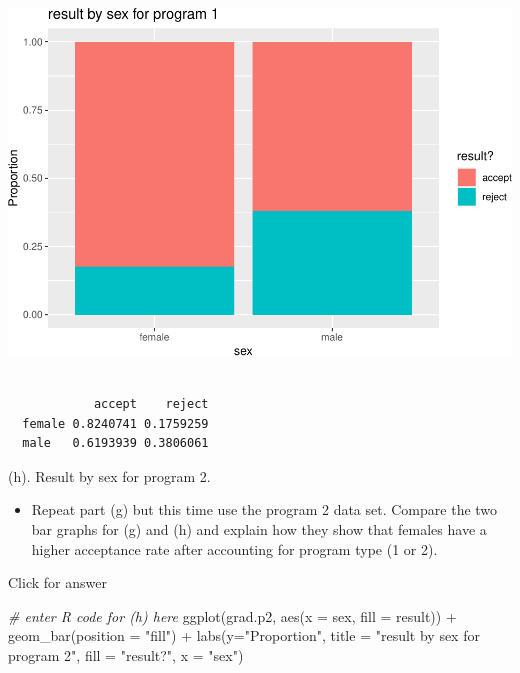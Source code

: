 \documentclass[
]{book}
\newenvironment{Shaded}{\begin{snugshade}}{\end{snugshade}}
\newcommand{\AttributeTok}[1]{\textcolor[rgb]{0.77,0.63,0.00}{#1}}
\newcommand{\CommentTok}[1]{\textcolor[rgb]{0.56,0.35,0.01}{\textit{#1}}}
\newcommand{\DecValTok}[1]{\textcolor[rgb]{0.00,0.00,0.81}{#1}}
\newcommand{\FunctionTok}[1]{\textcolor[rgb]{0.00,0.00,0.00}{#1}}
\newcommand{\NormalTok}[1]{#1}
\newcommand{\SpecialCharTok}[1]{\textcolor[rgb]{0.00,0.00,0.00}{#1}}
\newcommand{\StringTok}[1]{\textcolor[rgb]{0.31,0.60,0.02}{#1}}
\providecommand{\tightlist}{%
  \setlength{\itemsep}{0pt}\setlength{\parskip}{0pt}}
\begin{document}
\includegraphics[width=1\linewidth]{Class_Activity_4_files/figure-latex/unnamed-chunk-29-1}

\begin{Shaded}
\end{Shaded}

\begin{verbatim}
        
            accept    reject
  female 0.8240741 0.1759259
  male   0.6193939 0.3806061
\end{verbatim}

(h). Result by sex for program 2.

\begin{itemize}
\tightlist
\item
  Repeat part (g) but this time use the program 2 data set. Compare the two bar graphs for (g) and (h) and explain how they show that females have a higher acceptance rate after accounting for program type (1 or 2).
\end{itemize}

Click for answer

\begin{Shaded}
\begin{Highlighting}[]
\CommentTok{\# enter R code for (h) here}
\FunctionTok{ggplot}\NormalTok{(grad.p2, }\FunctionTok{aes}\NormalTok{(}\AttributeTok{x =}\NormalTok{ sex, }\AttributeTok{fill =}\NormalTok{ result)) }\SpecialCharTok{+}
 \FunctionTok{geom\_bar}\NormalTok{(}\AttributeTok{position =} \StringTok{"fill"}\NormalTok{) }\SpecialCharTok{+}
 \FunctionTok{labs}\NormalTok{(}\AttributeTok{y=}\StringTok{"Proportion"}\NormalTok{, }\AttributeTok{title =} \StringTok{"result by sex for program 2"}\NormalTok{,}
 \AttributeTok{fill =} \StringTok{"result?"}\NormalTok{, }\AttributeTok{x =} \StringTok{"sex"}\NormalTok{)}
\end{Highlighting}
\end{Shaded}
\end{document}
